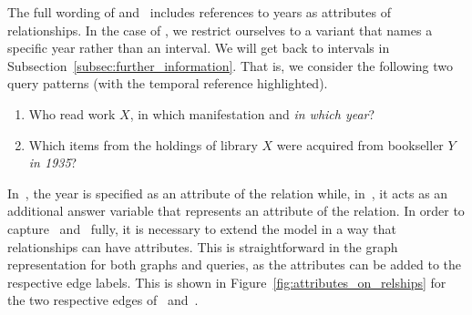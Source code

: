 The full wording of  and~ includes references to years
as attributes of relationships.
In the case of , we restrict ourselves to a variant that names
a specific year rather than an interval.
We will get back to intervals in Subsection~\ref{subsec:further_information}.
That is, we consider the following two query patterns (with the temporal reference highlighted).
%
\begin{enumerate}
  \item[\exaquery{1\phantom{$^\star$}}]
    Who read %
    work $X$, in which manifestation and \emph{in which year}?
  \item[\exaquery{5$^\star$}]
    Which items from the holdings of library $X$ were acquired from bookseller $Y$
    \emph{in 1935}?
\end{enumerate}
%
In~, the year is specified as an attribute of the  relation
while, in~, it acts as an additional answer variable that represents
an attribute of the  relation.
In order to capture~ and~ fully,
it is necessary to extend the model in a way that relationships can have attributes.
This is straightforward in the graph representation for both graphs and queries, as the attributes can be added to
the respective edge labels. This is shown in Figure~\ref{fig:attributes_on_relships}
for the two respective edges of~ and~.

